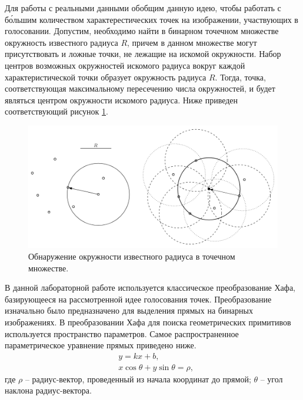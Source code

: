 \documentclass[a4paper, 16pt]{article}
\begin{document}
    \noindent Для работы с реальными данными обобщим данную идею, чтобы работать с б\'{о}льшим количеством
    характерестических точек на изображении, участвующих в голосовании. Допустим, необходимо найти в бинарном
    точечном множестве окружность известного радиуса $R$, причем в данном множестве могут присутствовать и ложные 
    точки, не лежащие на искомой окружности. Набор центров возможных окружностей искомого радиуса вокруг каждой
    характеристической точки образует окружность радиуса $R$. Тогда, точка, соответствующая максимальному
    пересечению числа окружностей, и будет являться центром окружности искомого радиуса. Ниже приведен соответствующий
    рисунок \ref{Рис:2}.
    \begin{figure}[!htb]
        \centering
        \includegraphics[scale=0.75]{circs.png}
        \captionsetup{skip=0pt}
        \caption{Обнаружение окружности известного радиуса в точечном множестве.}
        \label{Рис:2}
    \end{figure}


    \noindent В данной лабораторной работе используется классическое преобразование Хафа, базирующееся на
    рассмотренной идее голосования точек. Преобразование изначально было предназначено для выделения прямых
    на бинарных изображениях. В преобразовании Хафа для поиска геометрических примитивов используется пространство
    параметров. Самое распространенное параметрическое уравнение прямых приведено ниже.
    \begin{align}
        & y=kx+b,\label{eq:one}\\
        & x\cos{\theta}+y\sin{\theta}=\rho,\label{eq:two}
    \end{align}
    где $\rho$ -- радиус-вектор, проведенный из начала координат до прямой; $\theta$ -- угол наклона радиус-вектора.
\end{document}
